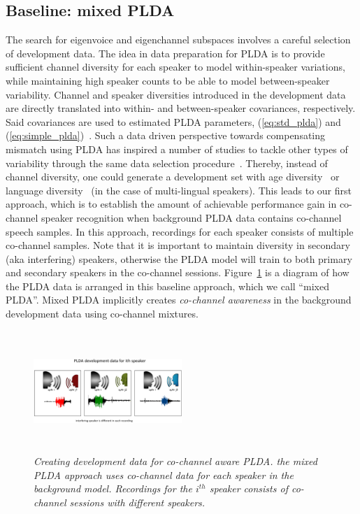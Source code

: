 \subsection{Baseline: mixed PLDA}
\label{ssec:plda_data_prep}
The search for eigenvoice and eigenchannel subspaces involves a careful selection of development data. 
The idea in data preparation for PLDA is to provide sufficient channel diversity for each speaker to model within-speaker variations, while maintaining high speaker counts to be able to model between-speaker variability. 
Channel and speaker diversities introduced in the development data are directly translated into within- and between-speaker covariances, respectively. Said covariances are used to estimated PLDA parameters, (\ref{eq:std_plda}) and (\ref{eq:simple_plda})~\cite{brummer_twocovariance}. 
Such a data driven perspective towards compensating mismatch using PLDA has inspired a number of studies to tackle other types of variability through the same data selection procedure~\cite{misra2014languagemismatch}. 
Thereby, instead of channel diversity, one could generate a development set with age diversity~\cite{finnian} or language diversity~\cite{misra2014languagemismatch} (in the case of multi-lingual speakers). 
This leads to our first approach, which is to establish the amount of achievable performance gain in co-channel speaker recognition when background PLDA data contains co-channel speech samples. 
In this approach, recordings for each speaker consists of multiple co-channel samples. 
Note that it is important to maintain diversity in secondary (aka interfering) speakers, otherwise the PLDA model will train to both primary and secondary speakers in the co-channel sessions. 
Figure~\ref{fig:mixedPLDA_diagram} is a diagram of how the PLDA data is arranged in this baseline approach, which we call ``mixed PLDA''. 
Mixed PLDA implicitly creates {\it co-channel awareness} in the background development data using co-channel mixtures. 


\begin{figure}[t!]
	\centering
	\vspace{0mm}
	\includegraphics[width=0.5\textwidth, height=1.8in]{chapters/cochannelplda_jp/IEEEtran/figures/mixedPLDA_slide-crop}
	\vspace{-5mm}
	\caption{\it \small Creating development data for co-channel aware PLDA. the mixed PLDA approach uses co-channel data for each speaker in the background model. Recordings for the $i^{th}$ speaker consists of co-channel sessions with different speakers.}
	\label{fig:mixedPLDA_diagram}
	\vspace{-3mm}
\end{figure}

